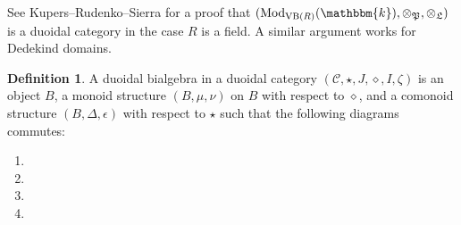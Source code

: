\documentclass[11pt,letterpaper]{amsart}
\newcommand{\bk}{\mathbbm{k}}
\DeclareMathOperator{\Mod}{Mod}
\DeclareMathOperator{\VB}{VB}
\newcommand{\PP}{\mathfrak{P}}
\newcommand{\LL}{\mathfrak{L}}
\numberwithin{theoremcounter}{section}
\theoremstyle{definition}
\newtheorem{definition}[Defauto]{Definition}
\theoremstyle{remark}
\begin{document}
See Kupers--Rudenko--Sierra \cite[Section 2.2]{KRS1} for a proof that 
$(\Mod_{\VB(R)}(\bk),\otimes_\PP,\otimes_\LL)$ is a duoidal category in the case $R$ is a field. A similar argument works for Dedekind domains.
\begin{definition}
    A duoidal bialgebra in a duoidal category $(\mathcal{C}, \star, J, \diamond, I,\zeta)$ is an object $B$, a monoid structure $(B,\mu,\nu)$ on $B$ with respect to $\diamond$, and a comonoid structure $(B,\Delta,\epsilon)$ with respect to $\star$ such that the following diagrams commutes:
\begin{enumerate}
    \item   
    \item  {}
    \item {}
    \item {}
\end{enumerate}

    
\end{definition}
\end{document}
